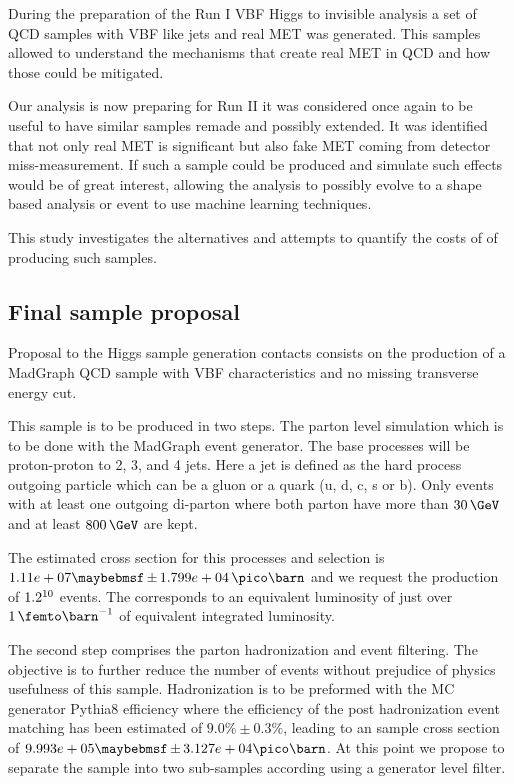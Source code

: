 During the preparation of the Run I \gls{VBF} Higgs to invisible analysis a set of \gls{QCD} samples with \gls{VBF} like jets and real \gls{MET} was generated. This samples allowed to understand the mechanisms that create real \gls{MET} in \gls{QCD} and how those could be mitigated.

Our analysis is now preparing for Run II it was considered once again to be useful to have similar samples remade and possibly extended. It was identified that not only real \gls{MET} is significant but also fake \gls{MET} coming from detector miss-measurement. If such a sample could be produced and simulate such effects would be of great interest, allowing the analysis to possibly evolve to a shape based analysis or event to use machine learning techniques.

This study investigates the alternatives and attempts to quantify the costs of of producing such samples.





\subsection{Final sample proposal}


Proposal to the Higgs sample generation contacts consists on the production of a MadGraph QCD sample with VBF characteristics and no missing transverse energy cut.

This sample is to be produced in two steps. The parton level simulation which is to be done with the MadGraph event generator. The base processes will be proton-proton to 2, 3, and 4 jets. Here a jet is defined as the hard process outgoing particle which can be a gluon or a quark (u, d, c, s or b). Only events with at least one outgoing di-parton where both parton have more than $30\,\GeV$ and at least $800\,\GeV$ are kept. 

The estimated cross section for this processes and selection is $1.11e+07 \pm 1.799e+04 \,\pico\barn$ and we request the production of $1.2 \time 10^{10}$ events. The corresponds to an equivalent luminosity of just over $1\,\femto\barn^{-1}$ of equivalent integrated luminosity.

The second step comprises the parton hadronization and event filtering. The objective is to further reduce the number of events without prejudice of physics usefulness of this sample. Hadronization is to be preformed with the \gls{MC} generator Pythia8 efficiency where the efficiency of the post hadronization event matching has been estimated of $9.0\% \pm 0.3\%$, leading to an sample cross section of $9.993e+05 \pm 3.127e+04 \pico\barn$. At this point we propose to separate the sample into two sub-samples according using a generator level filter. 

